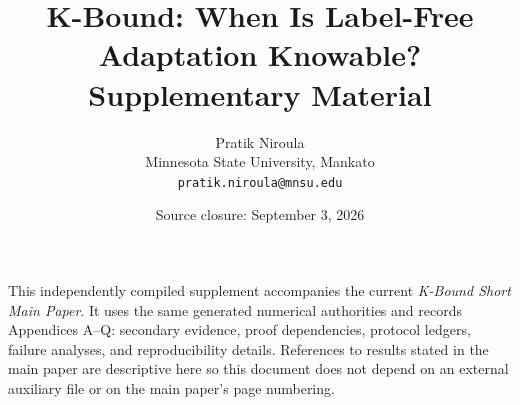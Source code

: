 \documentclass[11pt]{article}
\title{\textbf{K-Bound: When Is Label-Free Adaptation Knowable?}\\[2pt]
\large Supplementary Material}
\author{Pratik Niroula\\
\small Minnesota State University, Mankato\\
\small \texttt{pratik.niroula@mnsu.edu}}
\date{Source closure: September 3, 2026}
\theoremstyle{plain}
\theoremstyle{definition}
\theoremstyle{remark}
\begin{document}
\maketitle
\noindent This independently compiled supplement accompanies the current
\emph{K-Bound Short Main Paper}. It uses the same generated numerical authorities and
records Appendices A--Q: secondary evidence, proof dependencies, protocol ledgers,
failure analyses, and reproducibility details. References to results stated in the
main paper are descriptive here so this document does not depend on an external
auxiliary file or on the main paper's page numbering.

{\scriptsize}
\end{document}
